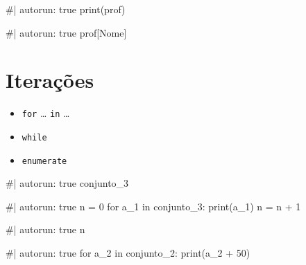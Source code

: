 \documentclass[
  letterpaper,
  DIV=11,
  numbers=noendperiod]{scrreprt}
\newenvironment{Shaded}{\begin{snugshade}}{\end{snugshade}}
\newcommand{\NormalTok}[1]{\textcolor[rgb]{0.00,0.23,0.31}{#1}}
\providecommand{\tightlist}{%
  \setlength{\itemsep}{0pt}\setlength{\parskip}{0pt}}
\begin{document}
\begin{Shaded}
\begin{Highlighting}[]
\NormalTok{\#| autorun: true}
\NormalTok{print(prof)}
\end{Highlighting}
\end{Shaded}

\begin{Shaded}
\begin{Highlighting}[]
\NormalTok{\#| autorun: true}
\NormalTok{prof[\textquotesingle{}Nome\textquotesingle{}]}
\end{Highlighting}
\end{Shaded}

\section{Iterações}\label{iterauxe7uxf5es}

\begin{itemize}
\tightlist
\item
  \texttt{for} \ldots{} \texttt{in} \ldots{}
\item
  \texttt{while}
\item
  \texttt{enumerate}
\end{itemize}

\begin{Shaded}
\begin{Highlighting}[]
\NormalTok{\#| autorun: true}
\NormalTok{conjunto\_3}
\end{Highlighting}
\end{Shaded}

\begin{Shaded}
\begin{Highlighting}[]
\NormalTok{\#| autorun: true}
\NormalTok{n = 0}
\NormalTok{for a\_1 in conjunto\_3:}
\NormalTok{    print(a\_1)}
\NormalTok{    n = n + 1}
\end{Highlighting}
\end{Shaded}

\begin{Shaded}
\begin{Highlighting}[]
\NormalTok{\#| autorun: true}
\NormalTok{n}
\end{Highlighting}
\end{Shaded}

\begin{Shaded}
\begin{Highlighting}[]
\NormalTok{\#| autorun: true}
\NormalTok{for a\_2 in conjunto\_2:}
\NormalTok{    print(a\_2 + 50)}
\end{Highlighting}
\end{Shaded}
\end{document}
